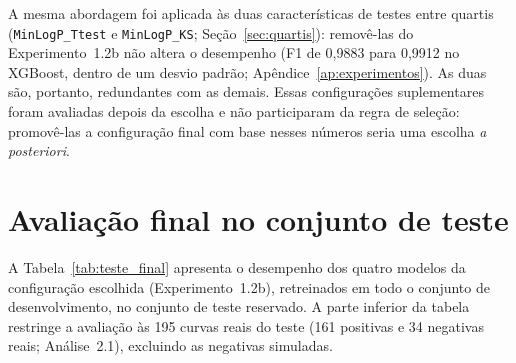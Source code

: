 A mesma abordagem foi aplicada às duas características de testes entre quartis (\texttt{MinLogP\_Ttest} e \texttt{MinLogP\_KS}; Seção~\ref{sec:quartis}): removê-las do Experimento~1.2b não altera o desempenho (F1 de 0,9883 para 0,9912 no XGBoost, dentro de um desvio padrão; Apêndice~\ref{ap:experimentos}). As duas são, portanto, redundantes com as demais. Essas configurações suplementares foram avaliadas depois da escolha e não participaram da regra de seleção: promovê-las a configuração final com base nesses números seria uma escolha \textit{a posteriori}.

\section{Avaliação final no conjunto de teste}
\label{sec:teste_final}
\label{sec:generalizacao_real}

A Tabela~\ref{tab:teste_final} apresenta o desempenho dos quatro modelos da configuração escolhida (Experimento~1.2b), retreinados em todo o conjunto de desenvolvimento, no conjunto de teste reservado. A parte inferior da tabela restringe a avaliação às 195 curvas reais do teste (161 positivas e 34 negativas reais; Análise~2.1), excluindo as negativas simuladas.

